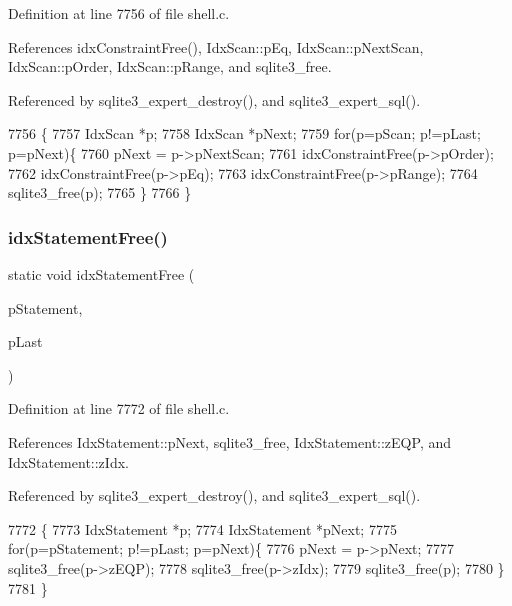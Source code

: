 Definition at line 7756 of file shell.\+c.



References idx\+Constraint\+Free(), Idx\+Scan\+::p\+Eq, Idx\+Scan\+::p\+Next\+Scan, Idx\+Scan\+::p\+Order, Idx\+Scan\+::p\+Range, and sqlite3\+\_\+free.



Referenced by sqlite3\+\_\+expert\+\_\+destroy(), and sqlite3\+\_\+expert\+\_\+sql().


\begin{DoxyCode}
7756                                                        \{
7757   IdxScan *p;
7758   IdxScan *pNext;
7759   \textcolor{keywordflow}{for}(p=pScan; p!=pLast; p=pNext)\{
7760     pNext = p->pNextScan;
7761     idxConstraintFree(p->pOrder);
7762     idxConstraintFree(p->pEq);
7763     idxConstraintFree(p->pRange);
7764     sqlite3_free(p);
7765   \}
7766 \}
\end{DoxyCode}
\mbox{\label{shell_8c_a592cf1c632355ee55fab38e44eff98c4}} 
\subsubsection{idx\+Statement\+Free()}
{\footnotesize\ttfamily static void idx\+Statement\+Free (\begin{DoxyParamCaption}\item[{\textbf{ Idx\+Statement} $\ast$}]{p\+Statement,  }\item[{\textbf{ Idx\+Statement} $\ast$}]{p\+Last }\end{DoxyParamCaption})\hspace{0.3cm}{\ttfamily [static]}}



Definition at line 7772 of file shell.\+c.



References Idx\+Statement\+::p\+Next, sqlite3\+\_\+free, Idx\+Statement\+::z\+E\+QP, and Idx\+Statement\+::z\+Idx.



Referenced by sqlite3\+\_\+expert\+\_\+destroy(), and sqlite3\+\_\+expert\+\_\+sql().


\begin{DoxyCode}
7772                                                                            \{
7773   IdxStatement *p;
7774   IdxStatement *pNext;
7775   \textcolor{keywordflow}{for}(p=pStatement; p!=pLast; p=pNext)\{
7776     pNext = p->pNext;
7777     sqlite3_free(p->zEQP);
7778     sqlite3_free(p->zIdx);
7779     sqlite3_free(p);
7780   \}
7781 \}
\end{DoxyCode}
\mbox{\label{shell_8c_aa9094cf24c8d7a3a6956874b542ed273}} 

